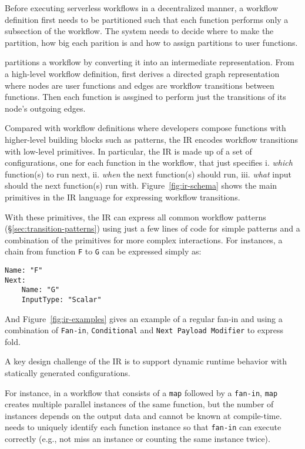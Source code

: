 Before executing serverless workflows in a decentralized manner, a workflow
definition first needs to be partitioned such that each function performs only
a subsection of the workflow. The system needs to decide where to make the
partition, how big each parition is and how to assign partitions to user
functions.

\name{} partitions a workflow by converting it into an intermediate
representation. From a high-level workflow definition, \name{} first derives a
directed graph representation where nodes are user functions and edges are
workflow transitions between functions. Then each function is assgined to
perform just the transitions of its node's outgoing edges.

Compared with workflow definitions where developers compose functions with
higher-level building blocks such as patterns, the \name{} IR encodes workflow
transitions with low-level primitives. In particular, the IR is made up of a
set of configurations, one for each function in the workflow, that just
specifies i. \textit{which} function(s) to run next, ii. \textit{when} the
next function(s) should run, iii. \textit{what} input should the next
function(s) run with. Figure~\ref{fig:ir-schema} shows the main primitives in
the \name{} IR language for expressing workflow transitions.

With these primitives, the IR can express all common workflow patterns
(\S\ref{sec:transition-patterns}) using just a few lines of code for simple
patterns and a combination of the primitives for more complex interactions.
For instances, a chain from function \texttt{F} to \texttt{G} can be expressed
simply as:
\begin{verbatim}
Name: "F"
Next:
    Name: "G"
    InputType: "Scalar"
\end{verbatim}

And Figure~\ref{fig:ir-examples} gives an example of a regular fan-in and
using a combination of \texttt{Fan-in}, \texttt{Conditional} and \texttt{Next
Payload Modifier} to express fold.

A key design challenge of the \name{} IR is to support dynamic runtime
behavior with statically generated configurations.

For instance, in a workflow that consists of a \texttt{map} followed by a
\texttt{fan-in}, \texttt{map} creates multiple parallel instances of the same
function, but the number of instances depends on the output data and cannot be
known at compile-time. \name{} needs to uniquely identify each function
instance so that \texttt{fan-in} can execute correctly (e.g., not miss an
instance or counting the same instance twice).

